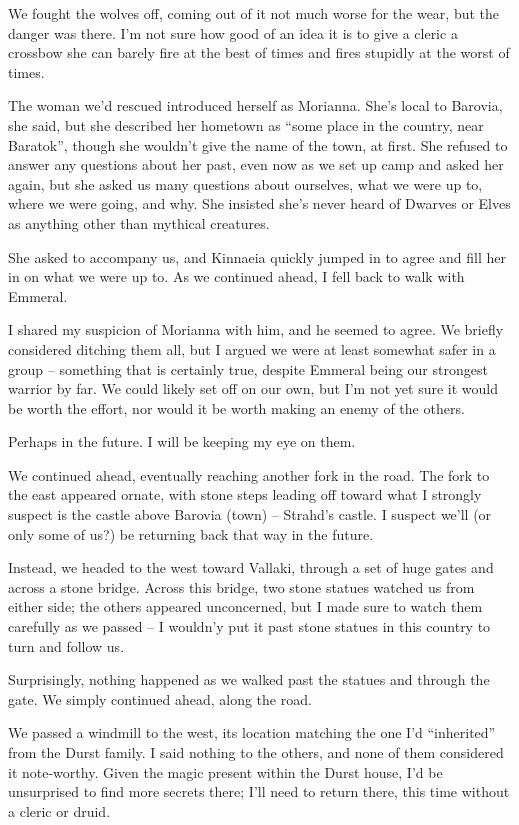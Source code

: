 We fought the wolves off, coming out of it not much worse for the wear, but the danger was there. I'm not sure how good of an idea it is to give a cleric a crossbow she can barely fire at the best of times and fires stupidly at the worst of times.

The woman we'd rescued introduced herself as Morianna. She's local to Barovia, she said, but she described her hometown as ``some place in the country, near Baratok'', though she wouldn't give the name of the town, at first. She refused to answer any questions about her past, even now as we set up camp and asked her again, but she asked us many questions about ourselves, what we were up to, where we were going, and why. She insisted she's never heard of Dwarves or Elves as anything other than mythical creatures.

She asked to accompany us, and Kinnaeia quickly jumped in to agree and fill her in on what we were up to. As we continued ahead, I fell back to walk with Emmeral.

I shared my suspicion of Morianna with him, and he seemed to agree. We briefly considered ditching them all, but I argued we were at least somewhat safer in a group -- something that is certainly true, despite Emmeral being our strongest warrior by far. We could likely set off on our own, but I'm not yet sure it would be worth the effort, nor would it be worth making an enemy of the others.

Perhaps in the future. I will be keeping my eye on them.

We continued ahead, eventually reaching another fork in the road. The fork to the east appeared ornate, with stone steps leading off toward what I strongly suspect is the castle above Barovia (town) -- Strahd's castle. I suspect we'll (or only some of us?) be returning back that way in the future.

Instead, we headed to the west toward Vallaki, through a set of huge gates and across a stone bridge. Across this bridge, two stone statues watched us from either side; the others appeared unconcerned, but I made sure to watch them carefully as we passed -- I wouldn'y put it past stone statues in this country to turn and follow us.

Surprisingly, nothing happened as we walked past the statues and through the gate. We simply continued ahead, along the road.

We passed a windmill to the west, its location matching the one I'd ``inherited'' from the Durst family. I said nothing to the others, and none of them considered it note-worthy. Given the magic present within the Durst house, I'd be unsurprised to find more secrets there; I'll need to return there, this time without a cleric or druid.

